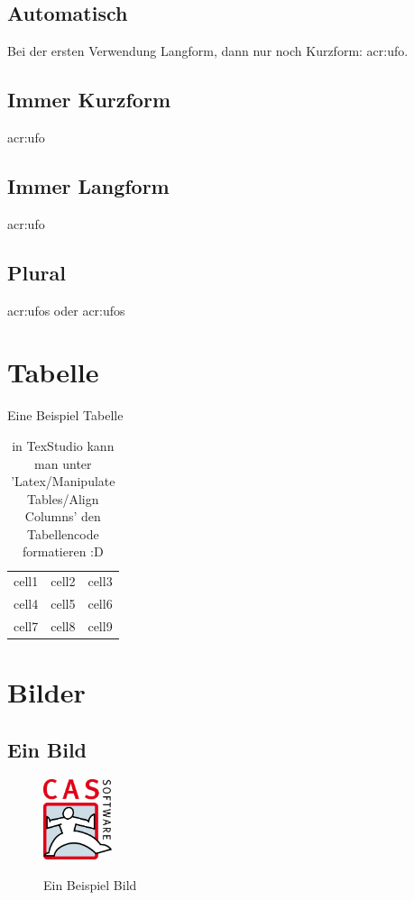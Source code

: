 \subsection{Automatisch}
Bei der ersten Verwendung Langform, dann nur noch Kurzform: \Ac{acr:ufo}.
\subsection{Immer Kurzform}
\acs{acr:ufo}
\subsection{Immer Langform}
\acf{acr:ufo}
\subsection{Plural}
\acsp{acr:ufo} oder \acfp{acr:ufo}

\section{Tabelle}
\begin{table}[H]
	\caption{Eine Beispiel Tabelle}
	\centering
	\begin{tabular}{ |c|c|c| } 
		\hline
		cell1 & cell2 & cell3 \\ 
		cell4 & cell5 & cell6 \\ 
		cell7 & cell8 & cell9 \\ 
		\hline
	\end{tabular}
	\label{Table:Beispiel}
	\caption[Meine Tabelle]{in TexStudio kann man unter 'Latex/Manipulate Tables/Align Columns' den Tabellencode formatieren :D}
\end{table}

\section{Bilder}
\subsection{Ein Bild}
\begin{figure}[H]
	\centering
	\includegraphics[width=2cm]{kapitel/0_offizielles/img/cas}
	\label{Image:Beispiel1}
	\caption{Ein Beispiel Bild}
\end{figure}
